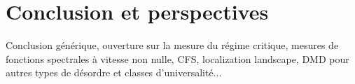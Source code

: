 
\chapter*{Conclusion et perspectives}

Conclusion générique, ouverture sur la mesure du régime critique, mesures de fonctions spectrales à vitesse non nulle, CFS, localization landscape, DMD pour autres types de désordre et classes d'universalité...


